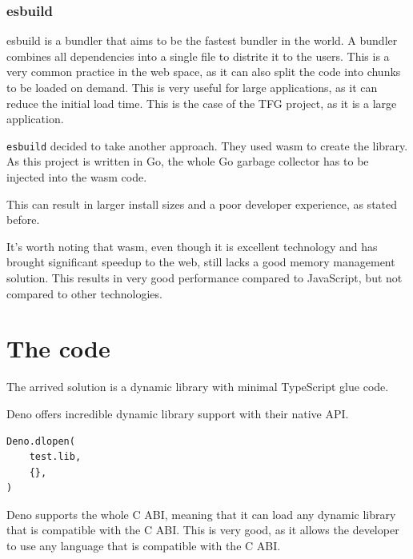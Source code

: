 \documentclass[10pt,journal,compsoc]{IEEEtran}
\begin{document}
\subsubsection{esbuild}

esbuild is a bundler \cite{Bundler} that aims to be the fastest bundler in the world. A bundler combines all dependencies into a single file to distrite it to the users. This is a very common practice in the web space, as it can also split the code into chunks to be loaded on demand. This is very useful for large applications, as it can reduce the initial load time. This is the case of the TFG \cite{TFG} project, as it is a large application.

\verb|esbuild| decided to take another approach. They used wasm \cite{WASM} \cite{WASMSPEC} to create the library. As this project is written in Go, the whole Go garbage collector has to be injected into the wasm code.

This can result in larger install sizes and a poor developer experience, as stated before.

It's worth noting that wasm, even though it is excellent technology and has brought significant speedup to the web, still lacks a good memory management solution. This results in very good performance compared to JavaScript, but not compared to other technologies.

\section{The code}

The arrived solution is a dynamic library with minimal TypeScript glue code.

Deno offers incredible dynamic library support with their native API.

\begin{lstlisting}
Deno.dlopen(
    test.lib,
    {},
)
\end{lstlisting}

Deno supports the whole C ABI, meaning that it can load any dynamic library that is compatible with the C ABI. This is very good, as it allows the developer to use any language that is compatible with the C ABI.
\end{document}
